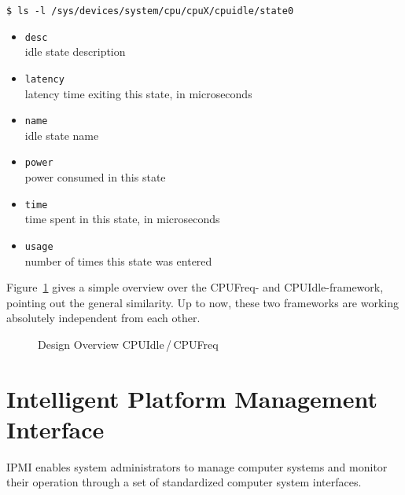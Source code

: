 \newpage
\noindent
\lstinline!$ ls -l /sys/devices/system/cpu/cpuX/cpuidle/state0!
%
%
%
\begin{multicols}{2}
\begin{itemize}
\renewcommand{\labelitemi}{\drsh}
\item \lstinline!desc!\\
	idle state description
\item \lstinline!latency!\\
	latency time exiting this state, in microseconds
\item \lstinline!name!\\
	idle state name
\item \lstinline!power!\\
	power consumed in this state
\item \lstinline!time!\\
	time spent in this state, in microseconds
\item \lstinline!usage!\\
	number of times this state was entered
\end{itemize}
\end{multicols}
%

\superpar
Figure~\ref{fig:cpufreqidle} gives a simple overview over the CPUFreq- and CPUIdle-framework, pointing out the general similarity. Up to now, these two frameworks are working absolutely independent from each other\cite{scheduler}.
%
\begin{figure}[ht]
	\centering
		\subfloat[CPUIdle]{}
	\hfill %
		\subfloat[CPUFreq]{}
	\caption[Design Overview CPUIdle\,/\,CPUFreq]{Design Overview CPUIdle\,/\,CPUFreq\cite{overview}}
	\label{fig:cpufreqidle}
\end{figure}
%

%
%
\section{Intelligent Platform Management Interface}
IPMI enables system administrators to manage computer systems and monitor their operation through a set of standardized computer system interfaces.

